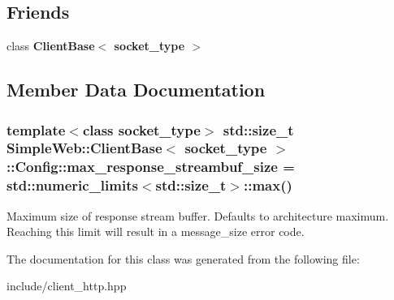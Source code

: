 \subsection*{Friends}
\begin{DoxyCompactItemize}
\item 
class {\bfseries Client\+Base$<$ socket\+\_\+type $>$}\hypertarget{classSimpleWeb_1_1ClientBase_1_1Config_aee5298660229dd276c7169cf7ef3d387}{}\label{classSimpleWeb_1_1ClientBase_1_1Config_aee5298660229dd276c7169cf7ef3d387}

\end{DoxyCompactItemize}


\subsection{Member Data Documentation}
\subsubsection[{\texorpdfstring{max\+\_\+response\+\_\+streambuf\+\_\+size}{max_response_streambuf_size}}]{\setlength{\rightskip}{0pt plus 5cm}template$<$class socket\+\_\+type$>$ std\+::size\+\_\+t {\bf Simple\+Web\+::\+Client\+Base}$<$ socket\+\_\+type $>$\+::Config\+::max\+\_\+response\+\_\+streambuf\+\_\+size = std\+::numeric\+\_\+limits$<$std\+::size\+\_\+t$>$\+::max()}\hypertarget{classSimpleWeb_1_1ClientBase_1_1Config_a9858f6441a88cb6307584da4509681cb}{}\label{classSimpleWeb_1_1ClientBase_1_1Config_a9858f6441a88cb6307584da4509681cb}
Maximum size of response stream buffer. Defaults to architecture maximum. Reaching this limit will result in a message\+\_\+size error code. 

The documentation for this class was generated from the following file\+:\begin{DoxyCompactItemize}
\item 
include/client\+\_\+http.\+hpp\end{DoxyCompactItemize}
